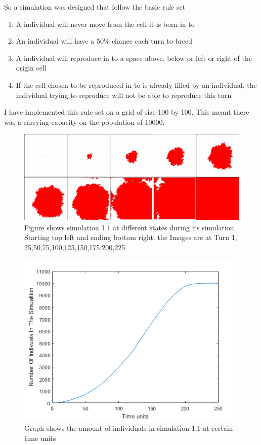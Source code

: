 \documentclass[final]{cmpreport}
\begin{document}
	So a simulation was designed that follow the basic rule set
	\begin{enumerate}
		\item A individual will never move from the cell it is born in to 
		\item An individual will have a 50\% chance each turn to breed
		\item A individual will reproduce in to a space above, below or left or right of the origin cell
		\item If the cell chosen to be reproduced in to is already filled by an  individual, the individual trying to reproduce will not be able to reproduce this turn
	\end{enumerate}
	
	I have implemented this rule set on a grid of size 100 by 100. This meant there was a carrying capacity on the population of 10000. 
	
	\begin{figure}[h!] 
		\includegraphics[width=\textwidth]{simulation1_1Collage.png}
		\caption{Figure shows simulation 1.1 at different states during its simulation. Starting top left and ending bottom right. the Images are at Turn 1, 25,50,75,100,125,150,175,200,225}  
	\end{figure}
	
	\begin{figure}[h!] 
		\includegraphics[width=\textwidth]{Simulation1GraphNumberIndivuals.png}
		\caption{Graph shows the amount of individuals in simulation 1.1 at certain time units}  
	\end{figure}
	
\end{document}
